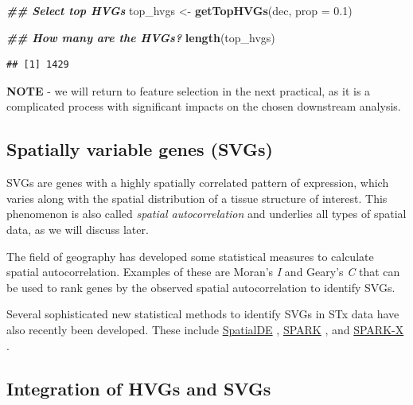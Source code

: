 \documentclass[
]{book}
\newenvironment{Shaded}{\begin{snugshade}}{\end{snugshade}}
\newcommand{\AttributeTok}[1]{\textcolor[rgb]{0.13,0.29,0.53}{#1}}
\newcommand{\DocumentationTok}[1]{\textcolor[rgb]{0.56,0.35,0.01}{\textbf{\textit{#1}}}}
\newcommand{\FloatTok}[1]{\textcolor[rgb]{0.00,0.00,0.81}{#1}}
\newcommand{\FunctionTok}[1]{\textcolor[rgb]{0.13,0.29,0.53}{\textbf{#1}}}
\newcommand{\NormalTok}[1]{#1}
\newcommand{\OtherTok}[1]{\textcolor[rgb]{0.56,0.35,0.01}{#1}}
\begin{document}
\begin{Shaded}
\begin{Highlighting}[]
\DocumentationTok{\#\# Select top HVGs}
\NormalTok{top\_hvgs }\OtherTok{\textless{}{-}} \FunctionTok{getTopHVGs}\NormalTok{(dec, }\AttributeTok{prop =} \FloatTok{0.1}\NormalTok{)}

\DocumentationTok{\#\# How many are the HVGs?}
\FunctionTok{length}\NormalTok{(top\_hvgs)}
\end{Highlighting}
\end{Shaded}

\begin{verbatim}
## [1] 1429
\end{verbatim}

\textbf{NOTE} - we will return to feature selection in the next practical, as it is a complicated process with significant impacts on the chosen downstream analysis.

\hypertarget{spatially-variable-genes-svgs}{%
\subsection{Spatially variable genes (SVGs)}\label{spatially-variable-genes-svgs}}

SVGs are genes with a highly spatially correlated pattern of expression, which varies along with the spatial distribution of a tissue structure of interest. This phenomenon is also called \emph{spatial autocorrelation} and underlies all types of spatial data, as we will discuss later.

The field of geography has developed some statistical measures to calculate spatial autocorrelation. Examples of these are Moran's \emph{I} \citep{Moran1950Jun} and Geary's \emph{C} \citep{Geary1954Nov} that can be used to rank genes by the observed spatial autocorrelation to identify SVGs.

Several sophisticated new statistical methods to identify SVGs in STx data have also recently been developed. These include \href{https://github.com/Teichlab/SpatialDE}{SpatialDE} \citep{Svensson2018May}, \href{https://xzhoulab.github.io/SPARK/}{SPARK} \citep{Sun2020Feb}, and \href{https://xzhoulab.github.io/SPARK/}{SPARK-X} \citep{Zhu2021Dec}.

\hypertarget{integration-of-hvgs-and-svgs}{%
\subsection{Integration of HVGs and SVGs}\label{integration-of-hvgs-and-svgs}}
\end{document}
